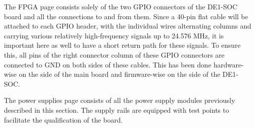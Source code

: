 The FPGA page consists solely of the two GPIO connectors of the DE1-SOC board and all the connections to and from them. Since a 40-pin flat cable will be attached to each GPIO header, with the individual wires alternating columns and carrying various relatively high-frequency signals up to 24.576 MHz, it is important here as well to have a short return path for these signals. To ensure this, all pins of the right connector column of these GPIO connectors are connected to GND on both sides of these cables. This has been done hardware-wise on the side of the main board and firmware-wise on the side of the DE1-SOC.

The power supplies page consists of all the power supply modules previously described in this section. The supply rails are equipped with test points to facilitate the qualification of the board.